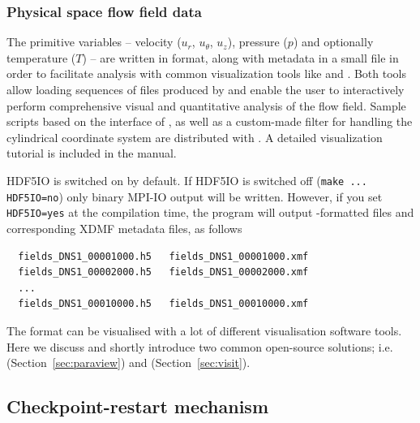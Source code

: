 \documentclass[a4paper, 11pt, DIV=11]{scrartcl}
\begin{document}
\subsubsection{Physical space flow field data}
\label{sec:iohdf5}

 The primitive 
variables -- velocity ($u_r$, $u_{\theta}$, $u_{z}$), pressure ($p$) and 
optionally temperature ($T$) -- are written in  format, along with 
metadata in a small  file in order to facilitate analysis with common 
visualization tools like  and . Both tools allow 
loading sequences of  files produced by \nsc and enable the user to 
interactively perform comprehensive visual and quantitative analysis of the flow 
field. Sample scripts based on the  interface of , as 
well as a custom-made  filter for handling the cylindrical 
coordinate system %
are distributed with \nsc. A detailed visualization tutorial is included in the
manual.


HDF5IO is switched on by default.
If HDF5IO is switched off (\verb+make ... HDF5IO=no+) only binary MPI-IO output will be written.
However, if you set \verb+HDF5IO=yes+ at the compilation time, 
the program will output \hdf-formatted files and corresponding
XDMF metadata files, as follows
\begin{verbatim}
  fields_DNS1_00001000.h5   fields_DNS1_00001000.xmf
  fields_DNS1_00002000.h5   fields_DNS1_00002000.xmf
  ...
  fields_DNS1_00010000.h5   fields_DNS1_00010000.xmf
\end{verbatim}
The \hdf format can be visualised with a lot of different visualisation software
tools. Here we discuss and shortly introduce two common open-source solutions;
i.e. \paraview (Section~\ref{sec:paraview}) and \visit (Section~\ref{sec:visit}). 

\subsection{Checkpoint-restart mechanism}
\label{sec:checkpoint}
\end{document}
